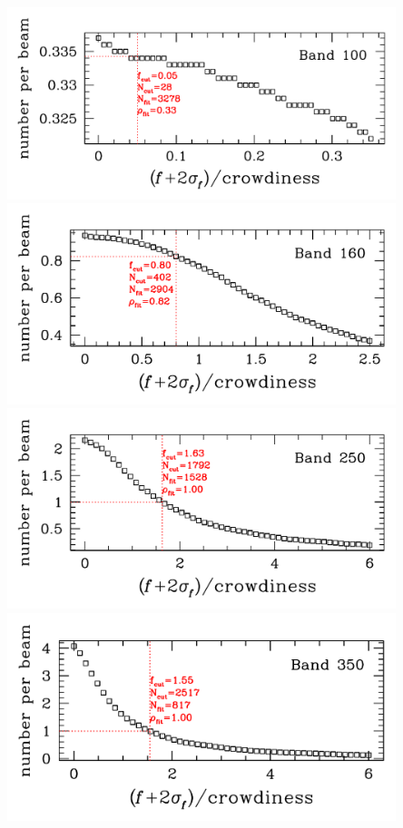 \documentclass[11pt,a4paper]{article}
\begin{document}
\begin{center}
	\includegraphics[width=0.85\textwidth]{galsed_plot_cutting_flux_100_with_crow_201512} \\
	\includegraphics[width=0.85\textwidth]{galsed_plot_cutting_flux_160_with_crow_201512} \\
	\includegraphics[width=0.85\textwidth]{galsed_plot_cutting_flux_250_with_crow_201512} \\
	\includegraphics[width=0.85\textwidth]{galsed_plot_cutting_flux_350_with_crow_201512} \\

\end{center}
\end{document}
